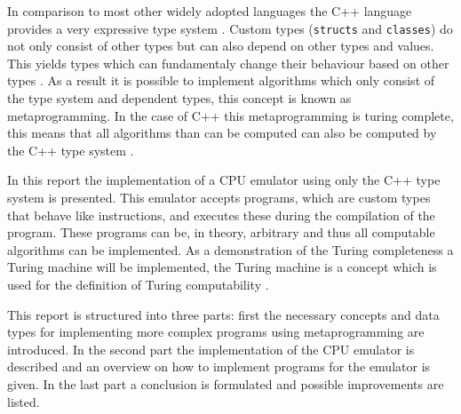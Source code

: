 

In comparison to most other widely adopted languages the C++ language provides a very expressive type system \cite{concepts05}. Custom
types (\lstinline{structs} and \lstinline{classes}) do not only consist of other types but can also depend on other
types and values. This yields types which can fundamentaly change their behaviour based on other types \cite[Chapter~13.3]{std}. As a result
it is possible to implement algorithms which only consist of the type system and dependent types, this concept is known
as metaprogramming. In the case of C++ this metaprogramming is turing complete, this means that all algorithms than
can be computed can also be computed by the C++ type system \cite{TuringComputability}.

In this report the implementation of a CPU emulator using only the C++ type system is presented. This emulator
accepts programs, which are custom types that behave like instructions, and executes these during the compilation of
the program. These programs can be, in theory, arbitrary and thus all computable algorithms can be implemented. As a
demonstration of the Turing completeness a Turing machine will be implemented, the Turing machine is a concept which
is used for the definition of Turing computability \cite{Turing1936}.

This report is structured into three parts: first the necessary concepts and data types for implementing more complex 
programs using metaprogramming are introduced. In the second part the implementation of the CPU emulator is described
and an overview on how to implement programs for the emulator is given. In the last part a conclusion is formulated and
possible improvements are listed.
